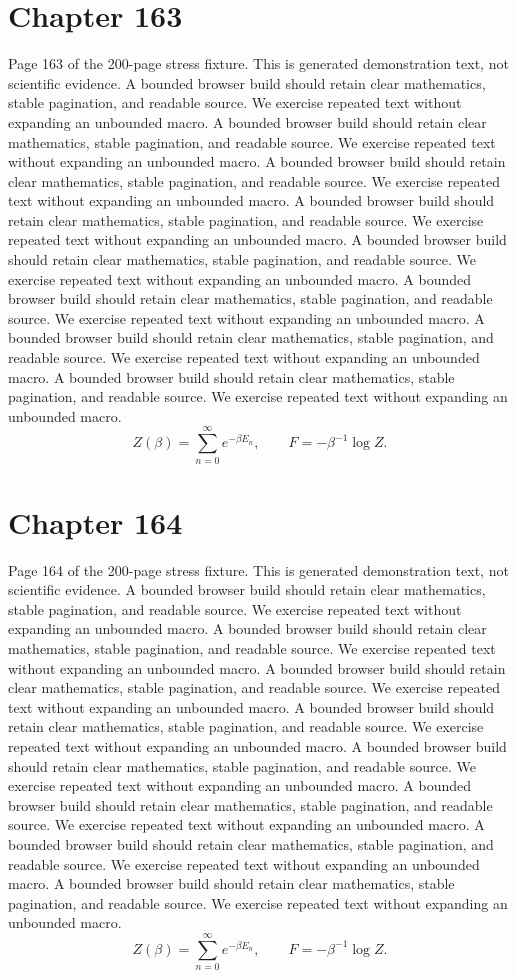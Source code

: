 \documentclass[11pt]{article}
\begin{document}
\section*{Chapter 163}
Page 163 of the 200-page stress fixture. This is generated demonstration text, not scientific evidence.
A bounded browser build should retain clear mathematics, stable pagination, and readable source. We exercise repeated text without expanding an unbounded macro.
A bounded browser build should retain clear mathematics, stable pagination, and readable source. We exercise repeated text without expanding an unbounded macro.
A bounded browser build should retain clear mathematics, stable pagination, and readable source. We exercise repeated text without expanding an unbounded macro.
A bounded browser build should retain clear mathematics, stable pagination, and readable source. We exercise repeated text without expanding an unbounded macro.
A bounded browser build should retain clear mathematics, stable pagination, and readable source. We exercise repeated text without expanding an unbounded macro.
A bounded browser build should retain clear mathematics, stable pagination, and readable source. We exercise repeated text without expanding an unbounded macro.
A bounded browser build should retain clear mathematics, stable pagination, and readable source. We exercise repeated text without expanding an unbounded macro.
A bounded browser build should retain clear mathematics, stable pagination, and readable source. We exercise repeated text without expanding an unbounded macro.
\[Z(\beta)=\sum_{n=0}^{\infty}e^{-\beta E_n},\qquad F=-\beta^{-1}\log Z.\]
\newpage
\section*{Chapter 164}
Page 164 of the 200-page stress fixture. This is generated demonstration text, not scientific evidence.
A bounded browser build should retain clear mathematics, stable pagination, and readable source. We exercise repeated text without expanding an unbounded macro.
A bounded browser build should retain clear mathematics, stable pagination, and readable source. We exercise repeated text without expanding an unbounded macro.
A bounded browser build should retain clear mathematics, stable pagination, and readable source. We exercise repeated text without expanding an unbounded macro.
A bounded browser build should retain clear mathematics, stable pagination, and readable source. We exercise repeated text without expanding an unbounded macro.
A bounded browser build should retain clear mathematics, stable pagination, and readable source. We exercise repeated text without expanding an unbounded macro.
A bounded browser build should retain clear mathematics, stable pagination, and readable source. We exercise repeated text without expanding an unbounded macro.
A bounded browser build should retain clear mathematics, stable pagination, and readable source. We exercise repeated text without expanding an unbounded macro.
A bounded browser build should retain clear mathematics, stable pagination, and readable source. We exercise repeated text without expanding an unbounded macro.
\[Z(\beta)=\sum_{n=0}^{\infty}e^{-\beta E_n},\qquad F=-\beta^{-1}\log Z.\]
\newpage
\end{document}
